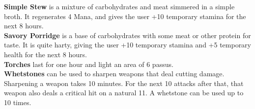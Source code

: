 \textbf{Simple Stew} is a mixture of carbohydrates and meat simmered in a simple broth. It regenerates 4 Mana, and gives the user +10 temporary stamina for the next 8 hours.\\


\textbf{Savory Porridge} is a base of carbohydrates with some meat or other protein for taste. It is quite harty, giving the user +10 temporary stamina and +5 temporary health for the next 8 hours.\\


\textbf{Torches} last for one hour and light an area of 6 passus.\\


\textbf{Whetstones} can be used to sharpen weapons that deal cutting damage. Sharpening a weapon takes 10 minutes. For the next 10 attacks after that, that weapon also deals a critical hit on a natural 11. A whetstone can be used up to 10 times.\\